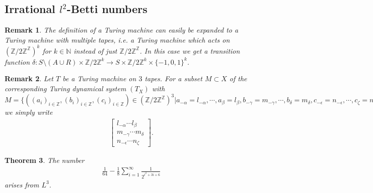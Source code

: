 \documentclass[12pt,a4paper]{scrartcl}
\newtheorem{Theorem}{Theorem}[section]
\newtheorem{Remark}[Theorem]{Remark}
\numberwithin{equation}{section}
\newcommand{\Z}{\mathbb{Z}} %
\newcommand{\N}{\mathbb{N}} %
\newcommand{\2}{\mathbb{Z} / 2 \mathbb{Z}}
\newcommand{\1}{\bar{1}}
\newcommand{\0}{\bar{0}}
\begin{document}
\subsection{Irrational $l^2$-Betti numbers}
\begin{Remark}
	The definition of a Turing machine can easily be expanded to a Turing machine with multiple tapes, i.e. a Turing machine which acts on $(\2^\Z)^k$ for $k \in \N$ instead of just $\2^\Z$. In this case we get a transition function $\delta: S \setminus(A \cup R) \times \2^k \to S \times \2^k \times \{-1, 0, 1\}^k$.
\end{Remark}
\begin{Remark}
	Let $T$ be a Turing machine on $3$ tapes. For a subset $M \subset X$ of the corresponding Turing dynamical system $(T_X)$ with $M = \{((a_i)_{i \in \Z}, (b_i)_{i \in \Z}, (c_i)_{i \in \Z}) \in (\2^\Z)^3 | a_{-\alpha} = l_{-\alpha}, \cdots, a_\beta = l_\beta, b_{-\gamma} = m_{-\gamma}, \cdots, b_\delta = m_\delta, c_{-\epsilon} = n_{-\epsilon}, \cdots, c_\zeta = n_\zeta \} \ \alpha, \beta, \gamma, \delta, \epsilon\ \zeta \in \N$ we simply write
	\begin{align*}
		\begin{bmatrix}
			l_{-\alpha} \cdots l_\beta \\
			m_{-\gamma} \cdots m_\delta \\
			n_{-\epsilon} \cdots n_\zeta
		\end{bmatrix}.
	\end{align*}
\end{Remark}
\begin{Theorem}
	The number
	\begin{align*}
		\frac{1}{64} - \frac{1}{8} \sum_{i = 1}^{\infty} \frac{1}{2^{i^2 + 3i + 6}}
	\end{align*}
	arises from $L^3$.
\end{Theorem}
\end{document}
